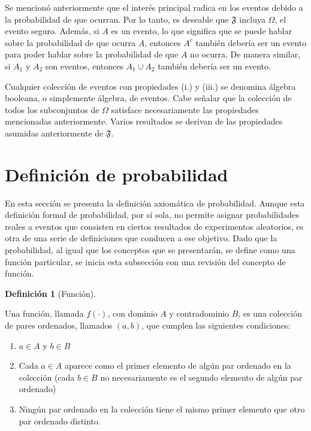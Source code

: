 \documentclass[
  us-letterpaper,
]{scrreprt}
\theoremstyle{plain}
\theoremstyle{definition}
\newtheorem{definition}{Definición}[chapter]
\theoremstyle{definition}
\theoremstyle{plain}
\theoremstyle{remark}
\begin{document}
Se mencionó anteriormente que el interés principal radica en los eventos
debido a la probabilidad de que ocurran. Por lo tanto, es deseable que
\(\mathfrak{F}\) incluya \(\Omega\), el evento seguro. Además, si \(A\)
es un evento, lo que significa que se puede hablar sobre la probabilidad
de que ocurra \(A\), entonces \(A^c\) también debería ser un evento para
poder hablar sobre la probabilidad de que \(A\) no ocurra. De manera
similar, si \(A_1\) y \(A_2\) son eventos, entonces \(A_1\cup A_2\)
también debería ser un evento.

Cualquier colección de eventos con propiedades (i.) y (iii.) se denomina
álgebra booleana, o simplemente álgebra, de eventos. Cabe señalar que la
colección de todos los subconjuntos de \(\Omega\) satisface
necesariamente las propiedades mencionadas anteriormente. Varios
resultados se derivan de las propiedades asumidas anteriormente de
\(\mathfrak{F}\).

\section{Definición de
probabilidad}\label{definiciuxf3n-de-probabilidad}

En esta sección se presenta la definición axiomática de probabilidad.
Aunque esta definición formal de probabilidad, por sí sola, no permite
asignar probabilidades reales a eventos que consisten en ciertos
resultados de experimentos aleatorios, es otra de una serie de
definiciones que conducen a ese objetivo. Dado que la probabilidad, al
igual que los conceptos que se presentarán, se define como una función
particular, se inicia esta subsección con una revisión del concepto de
función.

\begin{definition}[Función]\protect\hypertarget{def-funcion}{}\label{def-funcion}

Una función, llamada \(f(\cdot)\), con dominio \(A\) y contradominio
\(B\), es una colección de pares ordenados, llamados \((a,b)\), que
cumplen las siguientes condiciones:

\begin{enumerate}
\def\labelenumi{\roman{enumi}.}
\item
  \(a\in A\) y \(b\in B\)
\item
  Cada \(a\in A\) aparece como el primer elemento de algún par ordenado
  en la colección (cada \(b\in B\) no necesariamente es el segundo
  elemento de algún par ordenado)
\item
  Ningún par ordenado en la colección tiene el mismo primer elemento que
  otro par ordenado distinto.
\end{enumerate}

\end{definition}
\end{document}
